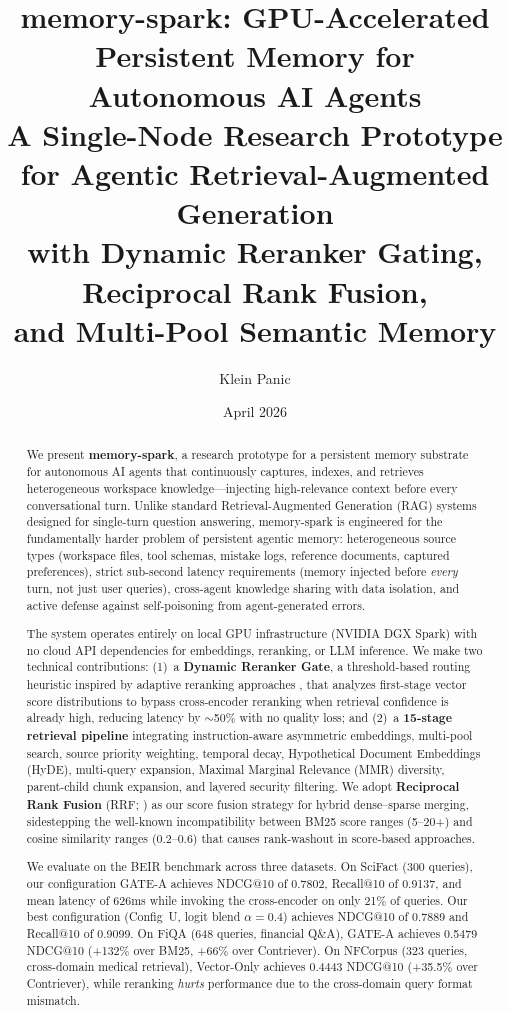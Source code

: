 \documentclass[11pt]{article}
\title{%
  \textbf{memory-spark: GPU-Accelerated Persistent Memory for Autonomous AI Agents}\\[0.5cm]
  \large A Single-Node Research Prototype for Agentic Retrieval-Augmented Generation\\
  with Dynamic Reranker Gating, Reciprocal Rank Fusion,\\
  and Multi-Pool Semantic Memory
}
\author[1]{Klein Panic}
\affil[1]{Virginia Tech, Department of Computer Science, \texttt{kleinpanic@vt.edu}}
\date{April 2026}
\begin{document}
\maketitle

\begin{abstract}
We present \textbf{memory-spark}, a research prototype for a persistent memory substrate for
autonomous AI agents that continuously captures, indexes, and retrieves heterogeneous
workspace knowledge---injecting high-relevance context before every conversational turn.
Unlike standard Retrieval-Augmented Generation (RAG) systems designed for single-turn
question answering, memory-spark is engineered for the fundamentally harder problem of
persistent agentic memory: heterogeneous source types (workspace files, tool schemas,
mistake logs, reference documents, captured preferences), strict sub-second latency
requirements (memory injected before \emph{every} turn, not just user queries),
cross-agent knowledge sharing with data isolation, and active defense against
self-poisoning from agent-generated errors.

The system operates entirely on local GPU infrastructure (NVIDIA DGX Spark) with no
cloud API dependencies for embeddings, reranking, or LLM inference. We make two technical contributions: (1)~a \textbf{Dynamic Reranker Gate}, a threshold-based routing heuristic inspired by adaptive reranking approaches \citep{macavaney2019cedr,yan2021parade}, that analyzes first-stage vector score distributions to bypass cross-encoder reranking when retrieval confidence is already high, reducing latency by $\sim$50\% with no quality loss; and (2)~a \textbf{15-stage retrieval pipeline} integrating instruction-aware asymmetric
embeddings, multi-pool search, source priority weighting, temporal decay,
Hypothetical Document Embeddings (HyDE), multi-query expansion, Maximal Marginal
Relevance (MMR) diversity, parent-child chunk expansion, and layered security filtering.
We adopt \textbf{Reciprocal Rank Fusion} (RRF; \citealt{cormack2009reciprocal}) as our
score fusion strategy for hybrid dense--sparse merging, sidestepping the well-known
incompatibility between BM25 score ranges (5--20+) and cosine similarity ranges
(0.2--0.6) that causes rank-washout in score-based approaches.

We evaluate on the BEIR benchmark \citep{thakur2021beir} across three datasets.
On SciFact (300 queries), our configuration GATE-A achieves NDCG@10 of
0.7802, Recall@10 of 0.9137, and mean latency of 626ms while invoking the cross-encoder
on only 21\% of queries. Our best configuration (Config~U, logit blend $\alpha=0.4$)
achieves NDCG@10 of 0.7889 and Recall@10 of 0.9099. On FiQA (648 queries, financial
Q\&A), GATE-A achieves 0.5479 NDCG@10 (+132\% over BM25, +66\% over Contriever). On
NFCorpus (323 queries, cross-domain medical retrieval), Vector-Only achieves 0.4443
NDCG@10 (+35.5\% over Contriever), while reranking \emph{hurts} performance due to the
cross-domain query format mismatch.


\end{abstract}
\end{document}
